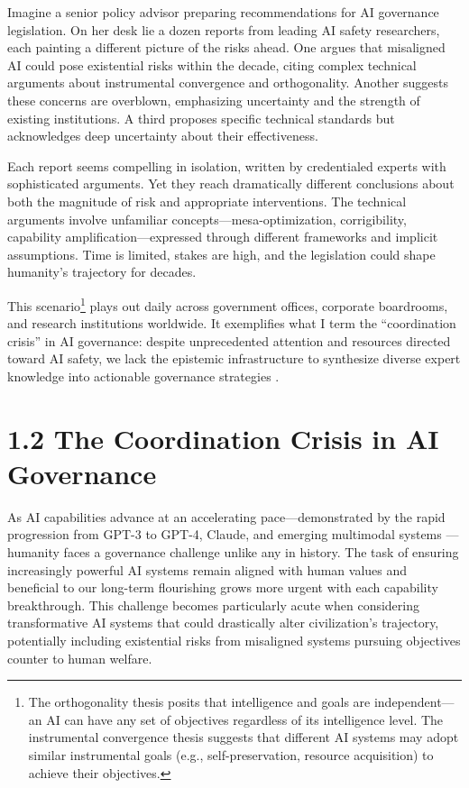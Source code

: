 \documentclass[
  11pt,
  letterpaper,
  openany]{book}
\begin{document}
Imagine a senior policy advisor preparing recommendations for AI
governance legislation. On her desk lie a dozen reports from leading AI
safety researchers, each painting a different picture of the risks
ahead. One argues that misaligned AI could pose existential risks within
the decade, citing complex technical arguments about instrumental
convergence and orthogonality. Another suggests these concerns are
overblown, emphasizing uncertainty and the strength of existing
institutions. A third proposes specific technical standards but
acknowledges deep uncertainty about their effectiveness.

Each report seems compelling in isolation, written by credentialed
experts with sophisticated arguments. Yet they reach dramatically
different conclusions about both the magnitude of risk and appropriate
interventions. The technical arguments involve unfamiliar
concepts---mesa-optimization, corrigibility, capability
amplification---expressed through different frameworks and implicit
assumptions. Time is limited, stakes are high, and the legislation could
shape humanity's trajectory for decades.

This scenario\footnote{The orthogonality thesis posits that intelligence
  and goals are independent---an AI can have any set of objectives
  regardless of its intelligence level. The instrumental convergence
  thesis suggests that different AI systems may adopt similar
  instrumental goals (e.g., self-preservation, resource acquisition) to
  achieve their objectives.} plays out daily across government offices,
corporate boardrooms, and research institutions worldwide. It
exemplifies what I term the ``coordination crisis'' in AI governance:
despite unprecedented attention and resources directed toward AI safety,
we lack the epistemic infrastructure to synthesize diverse expert
knowledge into actionable governance strategies \textcite{todd2024}.

\section{1.2 The Coordination Crisis in AI
Governance}\label{the-coordination-crisis-in-ai-governance}

As AI capabilities advance at an accelerating pace---demonstrated by the
rapid progression from GPT-3 to GPT-4, Claude, and emerging multimodal
systems \textcite{maslej2025} \textcite{samborska2025}---humanity faces
a governance challenge unlike any in history. The task of ensuring
increasingly powerful AI systems remain aligned with human values and
beneficial to our long-term flourishing grows more urgent with each
capability breakthrough. This challenge becomes particularly acute when
considering transformative AI systems that could drastically alter
civilization's trajectory, potentially including existential risks from
misaligned systems pursuing objectives counter to human welfare.
\end{document}
